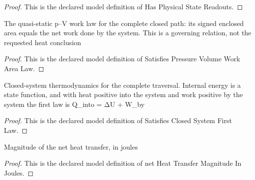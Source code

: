 \begin{proof}
  This is the declared model definition of Has Physical State Readouts.
\end{proof}
\begin{definition}
  \label{def:physics:phyx-mini-0470:phyxminiproblems-problemphyxmini0470-satisfiespressurevolumeworkarealaw}
  The quasi-static p--V work law for the complete closed path: its signed enclosed area equals the net work done by the system. This is a governing relation, not the requested heat conclusion
\end{definition}
\begin{proof}
  This is the declared model definition of Satisfies Pressure Volume Work Area Law.
\end{proof}
\begin{definition}
  \label{def:physics:phyx-mini-0470:phyxminiproblems-problemphyxmini0470-satisfiesclosedsystemfirstlaw}
  Closed-system thermodynamics for the complete traversal. Internal energy is a state function, and with heat positive into the system and work positive by the system the first law is Q\_into = ΔU + W\_by
\end{definition}
\begin{proof}
  This is the declared model definition of Satisfies Closed System First Law.
\end{proof}
\begin{definition}
  \label{def:physics:phyx-mini-0470:phyxminiproblems-problemphyxmini0470-netheattransfermagnitudeinjoules}
  Magnitude of the net heat transfer, in joules
\end{definition}
\begin{proof}
  This is the declared model definition of net Heat Transfer Magnitude In Joules.
\end{proof}
